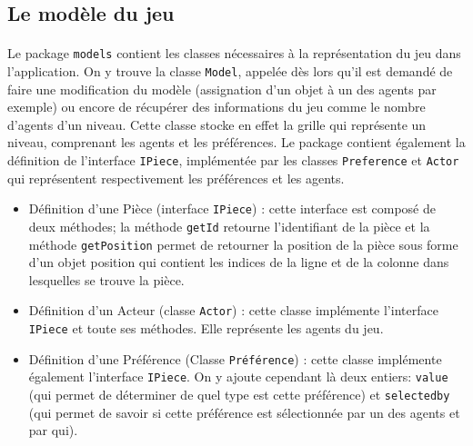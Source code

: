 \documentclass[../main.tex]{subfiles}
\begin{document}
	\subsection{Le modèle du jeu}

\paragraph{}
Le package \texttt{models} contient les classes nécessaires à la représentation du jeu dans l'application. On y trouve la classe \texttt{Model}, appelée dès lors qu'il est demandé de faire une modification du modèle (assignation d'un objet à un des agents par exemple) ou encore de récupérer des informations du jeu comme le nombre d'agents d'un niveau. Cette classe stocke en effet la grille qui représente un niveau, comprenant les agents et les préférences. Le package contient également la définition de l'interface \texttt{IPiece}, implémentée par les classes \texttt{Preference} et \texttt{Actor} qui représentent respectivement les préférences et les agents.

\begin{itemize}
\item Définition d'une Pièce (interface \texttt{IPiece}) : cette interface est composé de deux méthodes; la méthode \texttt{getId} retourne l'identifiant de la pièce et la méthode \texttt{getPosition} permet de retourner la position de la pièce sous forme d'un objet position qui contient les indices de la ligne et de la colonne dans lesquelles se trouve la pièce.
\item Définition d'un Acteur (classe \texttt{Actor}) : cette classe implémente l'interface \texttt{IPiece} et toute ses méthodes. Elle représente les agents du jeu.                                                                                                                                                                                                                                                                                                                                      
\item Définition d'une Préférence (Classe \texttt{Préférence}) : cette classe implémente également l’interface \texttt{IPiece}. On y ajoute cependant là deux entiers: \texttt{value} (qui permet de déterminer de quel type est cette préférence) et \texttt{selectedby} (qui permet de savoir si cette préférence est sélectionnée par un des agents et par qui). 
\end{itemize}
\end{document}
